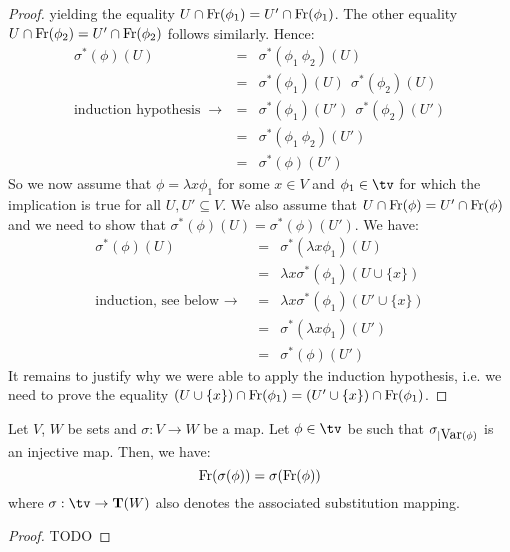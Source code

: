 \begin{proof}
    yielding the equality $U\cap\mbox{\rm Fr}(\phi_{1})=U'\cap\mbox{\rm Fr}(\phi_{1})$.
    The other equality $U\cap\mbox{\rm Fr}(\phi_{2})=U'\cap\mbox{\rm Fr}(\phi_{2})$ follows
    similarly. Hence:
        \begin{eqnarray*}\sigma^{*}(\phi)(U)
            &=&\sigma^{*}(\phi_{1}\ \phi_{2})(U)\\
            &=&\sigma^{*}(\phi_{1})(U)\ \ \sigma^{*}(\phi_{2})(U)\\
            \mbox{induction hypothesis $\ \rightarrow\ $}
            &=&\sigma^{*}(\phi_{1})(U')\ \ \sigma^{*}(\phi_{2})(U')\\
            &=&\sigma^{*}(\phi_{1}\ \phi_{2})(U')\\
            &=&\sigma^{*}(\phi)(U')
        \end{eqnarray*}
    So we now assume that $\phi=\lambda x\phi_{1}$ for some $x\in V$ and 
    $\phi_{1}\in\tv$ for which the implication is true for all $U,U'\subseteq V$.
    We also assume that $U\cap\mbox{\rm Fr}(\phi)=U'\cap\mbox{\rm Fr}(\phi)$ and we need to 
    show that $\sigma^{*}(\phi)(U)=\sigma^{*}(\phi)(U')$. We have:
        \begin{eqnarray*}\sigma^{*}(\phi)(U)
            &=&\sigma^{*}(\lambda x\phi_{1})(U)\\
            &=&\lambda x\sigma^{*}(\phi_{1})(U\cup\{x\})\\
            \mbox{induction, see below\ $\rightarrow$\ }
            &=&\lambda x\sigma^{*}(\phi_{1})(U'\cup\{x\})\\
            &=&\sigma^{*}(\lambda x\phi_{1})(U')\\
            &=&\sigma^{*}(\phi)(U')
        \end{eqnarray*}
    It remains to justify why we were able to apply the induction hypothesis, i.e.
    we need to prove the equality $(U\cup\{x\})\cap\mbox{\rm Fr}(\phi_{1})=
    (U'\cup\{x\})\cap\mbox{\rm Fr}(\phi_{1})$.
\end{proof}

\begin{prop}\label{logic:prop:LAM:freevar:of:substitution}
    Let $V$, $W$ be sets and $\sigma:V\to W$ be a map. Let $\phi\in\tv$ 
    be such that $\sigma_{|\mbox{\rm Var}(\phi)}$ is an injective map. Then, we have:
    \[
        \mbox{\rm Fr}(\sigma(\phi))=\sigma(\mbox{\rm Fr}(\phi))
    \]
    where $\sigma:\tv\to{\bf T}(W)$ also denotes the associated substitution 
    mapping.
\end{prop}
\begin{proof}
TODO
\end{proof}

